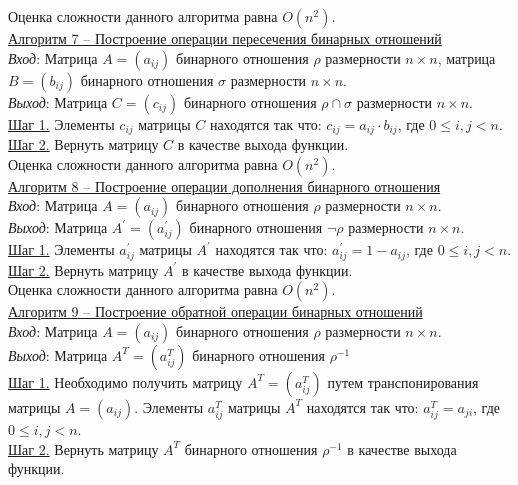 \documentclass[bachelor, och, labwork]{shiza}
\begin{document}
        Оценка сложности данного алгоритма равна $O(n^2)$.\\

        \underline{Алгоритм 7 -- Построение операции пересечения бинарных отношений}\\
            \textit{Вход}: Матрица $A = (a_{ij})$ бинарного отношения $\rho$ размерности $n \times n$, матрица $B = (b_{ij})$ 
            бинарного отношения $\sigma$ размерности $n \times n$.\\
            \textit{Выход}: Матрица $C = (c_{ij})$ бинарного отношения $\rho \cap \sigma$ размерности $n \times n$.\\
            \underline{Шаг 1.} Элементы $c_{ij}$ матрицы $C$ находятся так что: $c_{ij} = a_{ij} \cdot b_{ij}$, где
            $0 \leq i, j < n$. \\
            \underline{Шаг 2.} Вернуть матрицу $C$ в качестве выхода функции.\\

        Оценка сложности данного алгоритма равна $O(n^2)$.\\

        \underline{Алгоритм 8 -- Построение операции дополнения бинарного отношения}\\
            \textit{Вход}: Матрица $A = (a_{ij})$ бинарного отношения $\rho$ размерности $n \times n$.\\
            \textit{Выход}: Матрица $A^{'} = (a^{'}_{ij})$ бинарного отношения $\lnot \rho$ размерности $n \times n$.\\
            \underline{Шаг 1.} Элементы $a^{'}_{ij}$ матрицы $A^{'}$ находятся так что: $a^{'}_{ij} = 1 - a_{ij}$, где
            $0 \leq i, j < n$. \\
            \underline{Шаг 2.} Вернуть матрицу $A^{'}$ в качестве выхода функции.\\

        Оценка сложности данного алгоритма равна $O(n^2)$.\\


        \underline{Алгоритм 9 -- Построение обратной операции бинарных отношений}\\
            \textit{Вход}: Матрица $A = (a_{ij})$ бинарного отношения $\rho$ размерности $n \times n$.\\
            \textit{Выход}: Матрица $A^{T} = (a^{T}_{ij})$ бинарного отношения $\rho^{-1}$\\
            \underline{Шаг 1.} Необходимо получить матрицу $A^T = (a^{T}_{ij})$ путем транспонирования матрицы $A = (a_{ij})$.
            Элементы $a^T_{ij}$ матрицы $A^T$ находятся так что: $a^T_{ij} = a_{ji}$, где $0 \leq i, j < n$.\\
            \underline{Шаг 2.} Вернуть матрицу $A^T$ бинарного отношения $\rho^{-1}$ в качестве выхода функции.\\
            
\end{document}
